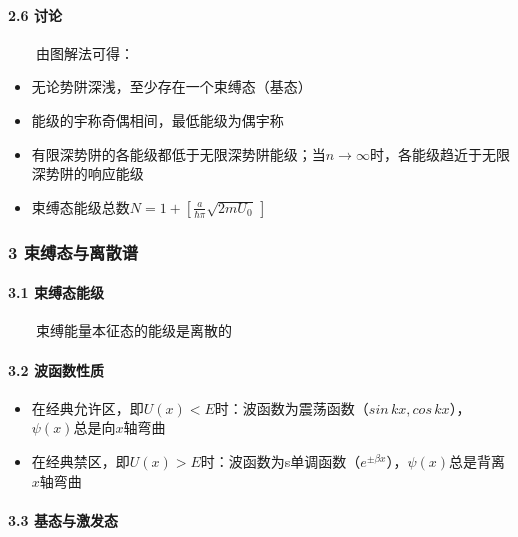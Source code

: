 \documentclass[UTF8,twocolumn]{ctexart}
\providecommand{\tightlist}{%
  \setlength{\itemsep}{0pt}\setlength{\parskip}{0pt}}
\let\oldparagraph\paragraph
\renewcommand{\paragraph}[1]{\oldparagraph{#1}\mbox{}}
\begin{document}
\hypertarget{ux8ba8ux8bba-3}{%
\paragraph{{ }2.6 讨论}\label{ux8ba8ux8bba-3}}

  由图解法可得：

\begin{itemize}
\tightlist
\item
  无论势阱深浅，至少存在一个束缚态（基态）
\item 
  能级的宇称奇偶相间，最低能级为偶宇称
\item 
  有限深势阱的各能级都低于无限深势阱能级；当\(n\to\infty\)时，各能级趋近于无限深势阱的响应能级
\item 
  束缚态能级总数\(N=1+[\frac{a}{\hbar\pi}\sqrt{2mU_0}\,]\)
\end{itemize}

\hypertarget{ux675fux7f1aux6001ux4e0eux79bbux6563ux8c31}{%
\subsubsection{3
束缚态与离散谱}\label{ux675fux7f1aux6001ux4e0eux79bbux6563ux8c31}}

\hypertarget{ux675fux7f1aux6001ux80fdux7ea7}{%
\paragraph{{ }3.1 束缚态能级}\label{ux675fux7f1aux6001ux80fdux7ea7}}

  束缚能量本征态的能级是离散的

\hypertarget{ux6ce2ux51fdux6570ux6027ux8d28}{%
\paragraph{{ }3.2 波函数性质}\label{ux6ce2ux51fdux6570ux6027ux8d28}}

\begin{itemize}
\tightlist
\item
  在经典允许区，即\(U(x)<E\)时：波函数为震荡函数（\(sin\,kx,cos\,kx\)），\(\psi(x)\)总是向\(x\)轴弯曲
\item
  在经典禁区，即\(U(x)>E\)时：波函数为s单调函数（\(e^{\pm\beta x}\)），\(\psi(x)\)总是背离\(x\)轴弯曲
\end{itemize}

\hypertarget{ux57faux6001ux4e0eux6fc0ux53d1ux6001}{%
\paragraph{{ }3.3
基态与激发态}\label{ux57faux6001ux4e0eux6fc0ux53d1ux6001}}
\end{document}
